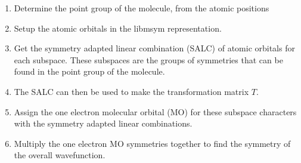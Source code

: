 \begin{enumerate}
    \item Determine the point group of the molecule, from the atomic positions
    \item Setup the atomic orbitals in the libmsym representation.
    \item Get the symmetry adapted linear combination (SALC) of atomic orbitals for 
    each subspace. These subspaces are the groups of symmetries that can be found
    in the point group of the molecule.
    \item The SALC can then be used to make the transformation matrix $T$.
    \item Assign the one electron molecular orbital (MO) for these subspace characters
     with the symmetry adapted linear combinations.
    \item Multiply the one electron MO symmetries together to find the symmetry 
    of the overall wavefunction.
\end{enumerate}

